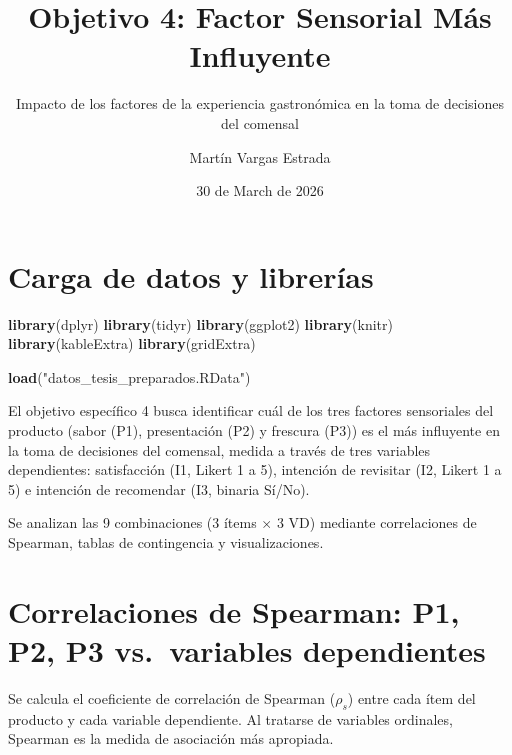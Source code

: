 \documentclass[
  spanish,
]{article}
\title{Objetivo 4: Factor Sensorial Más Influyente}
\subtitle{Impacto de los factores de la experiencia gastronómica en la
toma de decisiones del comensal}
\author{Martín Vargas Estrada}
\date{30 de March de 2026}
\newenvironment{Shaded}{\begin{snugshade}}{\end{snugshade}}
\newcommand{\FunctionTok}[1]{\textcolor[rgb]{0.13,0.29,0.53}{\textbf{#1}}}
\newcommand{\NormalTok}[1]{#1}
\newcommand{\StringTok}[1]{\textcolor[rgb]{0.31,0.60,0.02}{#1}}
\begin{document}
\maketitle

{
\setcounter{tocdepth}{3}
\tableofcontents
}
\section{Carga de datos y
librerías}\label{carga-de-datos-y-libreruxedas}

\begin{Shaded}
\begin{Highlighting}[]
\FunctionTok{library}\NormalTok{(dplyr)}
\FunctionTok{library}\NormalTok{(tidyr)}
\FunctionTok{library}\NormalTok{(ggplot2)}
\FunctionTok{library}\NormalTok{(knitr)}
\FunctionTok{library}\NormalTok{(kableExtra)}
\FunctionTok{library}\NormalTok{(gridExtra)}
\end{Highlighting}
\end{Shaded}

\begin{Shaded}
\begin{Highlighting}[]
\FunctionTok{load}\NormalTok{(}\StringTok{"datos\_tesis\_preparados.RData"}\NormalTok{)}
\end{Highlighting}
\end{Shaded}

El objetivo específico 4 busca identificar cuál de los tres factores
sensoriales del producto (sabor (P1), presentación (P2) y frescura (P3))
es el más influyente en la toma de decisiones del comensal, medida a
través de tres variables dependientes: satisfacción (I1, Likert 1 a 5),
intención de revisitar (I2, Likert 1 a 5) e intención de recomendar (I3,
binaria Sí/No).

Se analizan las 9 combinaciones (3 ítems \(\times\) 3 VD) mediante
correlaciones de Spearman, tablas de contingencia y visualizaciones.

\newpage

\section{Correlaciones de Spearman: P1, P2, P3 vs.~variables
dependientes}\label{correlaciones-de-spearman-p1-p2-p3-vs.-variables-dependientes}

Se calcula el coeficiente de correlación de Spearman (\(\rho_s\)) entre
cada ítem del producto y cada variable dependiente. Al tratarse de
variables ordinales, Spearman es la medida de asociación más apropiada.
\end{document}
